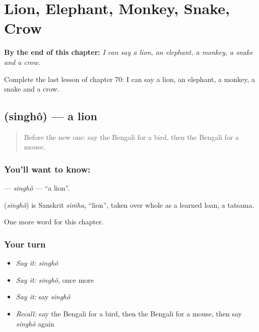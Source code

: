 
\chapter{Lion, Elephant, Monkey, Snake, Crow}
\label{ch:bn-lion-elephant-monkey-snake-crow}

\begin{chapteropening}
\textbf{By the end of this chapter:} \emph{I can say a lion, an elephant, a monkey, a snake and a crow.}

Complete the last lesson of chapter 70: I can say a lion, an elephant, a monkey, a snake and a crow.
\end{chapteropening}

\section[\texorpdfstring{\bn{সিংহ} (singhô)}{সিংহ (singhô)}]{ (singhô) — a lion}

\label{lesson:BN-C70-singho}



\begin{quote}
Before the new one: say the Bengali for a bird, then the Bengali for a mouse.
\end{quote}

\subsection*{You'll want to know: }
\textbf{} — \emph{singhô} — \textquotedblleft{}a lion\textquotedblright{}.

\begin{cousinweb}
\textbf{} (\emph{singhô}) is Sanskrit \emph{siṁha}, \textquotedblleft{}lion\textquotedblright{}, taken over whole as a learned loan, a tatsama.
\end{cousinweb}

\begin{grammarlens}[title={What you've built}]
One more word for this chapter.
\end{grammarlens}

\subsection*{Your turn}
\begin{itemize}
\raggedright
  \item \emph{Say it:} \emph{singhô}
  \item \emph{Say it:} \emph{singhô}, once more
  \item \emph{Say it:} say \emph{singhô}
  \item \emph{Recall:} say the Bengali for a bird, then the Bengali for a mouse, then say \emph{singhô} again
\end{itemize}

